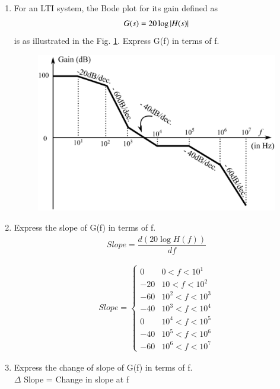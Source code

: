 \begin{enumerate}[label=\thesection.\arabic*.,ref=\thesection.\theenumi]

\item For an LTI system, the Bode plot for its gain defined as
\begin{align}
	G(s) = 20\log\abs{H(s)}
	\label{eq:ee18btech11001_gain}
\end{align}
is as illustrated in the Fig. \ref{fig:ee18btech11001_bode}. Express G(f) in terms of f.
\begin{figure}[ht!]
    \centering
    \includegraphics[width=\columnwidth]{./figs/ee18btech11001/ee18btech11001.eps}
    \caption{}
    \label{fig:ee18btech11001_bode}
\end{figure}

\solution 
\item Express the slope of G(f) in terms of f.
\\
\solution
\begin{align}
	Slope = \dfrac{d(20\log H(f))}{df}
\end{align}

\begin{align}
 Slope = 
 \begin{cases} 
        0 & 0 < f < 10^{1} \\
      -20 & 10 < f < 10^{2} \\
      -60 & 10^{2} < f < 10^{3} \\
      -40 & 10^{3} < f < 10^{4} \\
       0 & 10^{4} < f < 10^{5} \\
      -40 & 10^{5} < f < 10^{6} \\
      -60 & 10^{6} < f < 10^{7}   
 \end{cases}
\end{align}
%
\item Express the change of slope of G(f) in terms of f.
\\
\solution
$ \Delta$ Slope = Change in slope at f


\end{enumerate}
